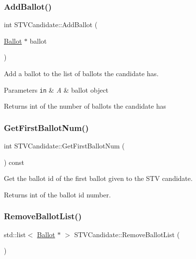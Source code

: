 \subsubsection{\texorpdfstring{Add\+Ballot()}{AddBallot()}}
{\footnotesize\ttfamily int S\+T\+V\+Candidate\+::\+Add\+Ballot (\begin{DoxyParamCaption}\item[{\hyperlink{classBallot}{Ballot} $\ast$}]{ballot }\end{DoxyParamCaption})}



Add a ballot to the list of ballots the candidate has. 


\begin{DoxyParams}[1]{Parameters}
\mbox{\tt in}  & {\em A} & ballot object \\
\hline
\end{DoxyParams}
\begin{DoxyReturn}{Returns}
int of the number of ballots the candidate has 
\end{DoxyReturn}
\mbox{\label{classSTVCandidate_a3281dae3d03733994405241e57a23eec}} 
\subsubsection{\texorpdfstring{Get\+First\+Ballot\+Num()}{GetFirstBallotNum()}}
{\footnotesize\ttfamily int S\+T\+V\+Candidate\+::\+Get\+First\+Ballot\+Num (\begin{DoxyParamCaption}{ }\end{DoxyParamCaption}) const}



Get the ballot id of the first ballot given to the S\+TV candidate. 

\begin{DoxyReturn}{Returns}
int of the ballot id number. 
\end{DoxyReturn}
\mbox{\label{classSTVCandidate_a4eac28947d47e9726a4c0565c7e60250}} 
\subsubsection{\texorpdfstring{Remove\+Ballot\+List()}{RemoveBallotList()}}
{\footnotesize\ttfamily std\+::list$<$ \hyperlink{classBallot}{Ballot} $\ast$ $>$ S\+T\+V\+Candidate\+::\+Remove\+Ballot\+List (\begin{DoxyParamCaption}{ }\end{DoxyParamCaption})}



